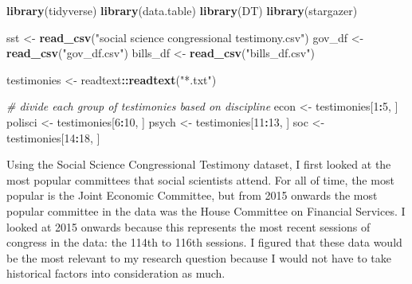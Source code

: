 \documentclass[]{article}
\newenvironment{Shaded}{\begin{snugshade}}{\end{snugshade}}
\newcommand{\CommentTok}[1]{\textcolor[rgb]{0.56,0.35,0.01}{\textit{#1}}}
\newcommand{\DecValTok}[1]{\textcolor[rgb]{0.00,0.00,0.81}{#1}}
\newcommand{\KeywordTok}[1]{\textcolor[rgb]{0.13,0.29,0.53}{\textbf{#1}}}
\newcommand{\NormalTok}[1]{#1}
\newcommand{\OperatorTok}[1]{\textcolor[rgb]{0.81,0.36,0.00}{\textbf{#1}}}
\newcommand{\StringTok}[1]{\textcolor[rgb]{0.31,0.60,0.02}{#1}}
\begin{document}
\begin{Shaded}
\begin{Highlighting}[]
\KeywordTok{library}\NormalTok{(tidyverse)}
\KeywordTok{library}\NormalTok{(data.table)}
\KeywordTok{library}\NormalTok{(DT)}
\KeywordTok{library}\NormalTok{(stargazer)}

\NormalTok{sst \textless{}{-}}\StringTok{ }\KeywordTok{read\_csv}\NormalTok{(}\StringTok{"social science congressional testimony.csv"}\NormalTok{)}
\NormalTok{gov\_df \textless{}{-}}\StringTok{ }\KeywordTok{read\_csv}\NormalTok{(}\StringTok{"gov\_df.csv"}\NormalTok{)}
\NormalTok{bills\_df \textless{}{-}}\StringTok{ }\KeywordTok{read\_csv}\NormalTok{(}\StringTok{"bills\_df.csv"}\NormalTok{)}

\NormalTok{testimonies \textless{}{-}}\StringTok{ }\NormalTok{readtext}\OperatorTok{::}\KeywordTok{readtext}\NormalTok{(}\StringTok{"*.txt"}\NormalTok{)}

\CommentTok{\# divide each group of testimonies based on discipline }
\NormalTok{econ \textless{}{-}}\StringTok{ }\NormalTok{testimonies[}\DecValTok{1}\OperatorTok{:}\DecValTok{5}\NormalTok{, ]}
\NormalTok{polisci \textless{}{-}}\StringTok{ }\NormalTok{testimonies[}\DecValTok{6}\OperatorTok{:}\DecValTok{10}\NormalTok{, ]}
\NormalTok{psych \textless{}{-}}\StringTok{ }\NormalTok{testimonies[}\DecValTok{11}\OperatorTok{:}\DecValTok{13}\NormalTok{, ]}
\NormalTok{soc \textless{}{-}}\StringTok{ }\NormalTok{testimonies[}\DecValTok{14}\OperatorTok{:}\DecValTok{18}\NormalTok{, ]}
\end{Highlighting}
\end{Shaded}

Using the Social Science Congressional Testimony dataset, I first looked
at the most popular committees that social scientists attend. For all of
time, the most popular is the Joint Economic Committee, but from 2015
onwards the most popular committee in the data was the House Committee
on Financial Services. I looked at 2015 onwards because this represents
the most recent sessions of congress in the data: the 114th to 116th
sessions. I figured that these data would be the most relevant to my
research question because I would not have to take historical factors
into consideration as much.

\begin{Shaded}
\end{Shaded}
\end{document}

